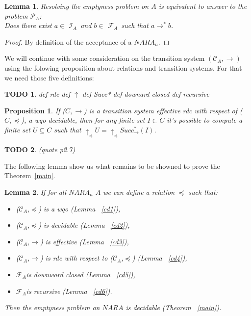 \documentclass[a4paper,10pt]{report}
\newtheorem{lm}{Lemma}[thr]
\newtheorem{pp}{Proposition}
\newtheorem{td}{TODO}
\newcommand{\C}{\mathcal{C}_{A}}
\newcommand{\I}{$\mathcal{I}_{A}$}
\newcommand{\F}{$\mathcal{F}_{A}$}
\newcommand{\pb}{$\mathcal{P}_{A}$}
\begin{document}
\begin{lm}
  \label{lmtth}
  Resolving the emptyness problem on $A$ is equivalent to answer to the problem \pb: \\
  Does there exist $a \in$ \I\ and $b \in$ \F\ such that $ a \rightarrow^* b $. 
\end{lm}
\begin{proof} 
  By definition of the acceptance of a $NARA_n$.
\end{proof}
We will continue with some consideration on the transition system $(\C,\rightarrow)$ using the folowing proposition about relations and transition systems.
For that we need those five definitions:


\begin{td}
def rdc
def $\uparrow$
def Succ*
def downard closed
def recursive
\end{td}


\begin{pp} 
  \label{pp}
  If  ($C,\rightarrow$) is a transition system effective rdc with respect of ($C,\preceq$), a wqo decidable, then for any finite set $I\subset C$ it's possible to compute a finite set $U \subseteq C$ such that
  $\uparrow_\preceq U=\uparrow_\preceq Succ^*_\rightarrow (I)$.
\end{pp}

\begin{td}
  (quote p2.7)
\end{td}

The following lemma show us what remains to be showned to prove the Theorem~\ref{main}.
\begin{lm}
    \label{mlm}
    If for all $NARA_n$ $A$ we can define a relation $\preceq$ such that: 
     \begin{itemize}
	\item ($\C$,$\preceq$) is a wqo (Lemma ~\ref{cd1}),
	\item ($\C$,$\preceq$) is decidable (Lemma ~\ref{cd2}),
	\item ($\C$,$\rightarrow$) is effective (Lemma ~\ref{cd3}),
	\item ($\C$,$\rightarrow$) is rdc with respect to ($\C$,$\preceq$) (Lemma ~\ref{cd4}),
	\item \F is downward closed (Lemma ~\ref{cd5}),
	\item \F is recursive (Lemma ~\ref{cd6}).
     \end{itemize}
      Then the emptyness problem on $NARA$ is decidable (Theorem ~\ref{main}).
\end{lm}
\end{document}
